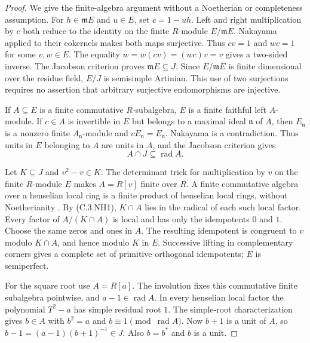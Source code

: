 \begin{proof}
We give the finite-algebra argument without a
Noetherian or completeness assumption.
For $h\in\mathfrak mE$ and $u\in E$, set
$c=1-uh$.  Left and right multiplication by
$c$ both reduce to the identity on the finite
$R$-module $E/\mathfrak mE$.
Nakayama applied to their cokernels makes
both maps surjective.  Thus $cv=1$ and
$wc=1$ for some $v,w\in E$.
The equality $w=w(cv)=(wc)v=v$ gives a
two-sided inverse.  The Jacobson criterion
proves $\mathfrak mE\subseteq J$.
Since $E/\mathfrak mE$ is finite dimensional
over the residue field, $E/J$ is semisimple
Artinian.  This use of two surjections
requires no assertion that arbitrary
surjective endomorphisms are injective.

If $A\subseteq E$ is a finite commutative
$R$-subalgebra, $E$ is a finite faithful
left $A$-module.  If $c\in A$ is invertible
in $E$ but belongs to a maximal ideal
$\mathfrak n$ of $A$, then
$E_{\mathfrak n}$ is a nonzero finite
$A_{\mathfrak n}$-module and
$cE_{\mathfrak n}=E_{\mathfrak n}$.
Nakayama is a contradiction.  Thus units
in $E$ belonging to $A$ are units in $A$,
and the Jacobson criterion gives
\[
                 A\cap J\subseteq\operatorname{rad}A.     \tag{C.3.NH1}
\]

Let $K\subseteq J$ and $v^2-v\in K$.
The determinant trick for multiplication
by $v$ on the finite $R$-module $E$
makes $A=R[v]$ finite over $R$.
A finite commutative algebra over a
henselian local ring is a finite product
of henselian local rings, without
Noetherianity
\cite[Lemma 10.153.4(1), Tag 04GH]
 {C-StacksCoherentHenselizations}.
By (C.3.NH1), $K\cap A$ lies in
the radical of each such local factor.
Every factor of $A/(K\cap A)$ is
local and has only the idempotents
$0$ and $1$.  Choose the same zeros
and ones in $A$.  The resulting
idempotent is congruent to $v$
modulo $K\cap A$, and hence modulo
$K$ in $E$.
Successive lifting in complementary
corners gives a complete set of
primitive orthogonal idempotents;
$E$ is semiperfect.

For the square root use $A=R[a]$.
The involution fixes this commutative
finite subalgebra pointwise, and
$a-1\in\operatorname{rad}A$.
In every henselian local factor
the polynomial $T^2-a$ has simple
residual root $1$.
The simple-root characterization
\cite[Lemma 10.153.3(2), Tag 04GG]
 {C-StacksCoherentHenselizations}
gives $b\in A$ with $b^2=a$
and $b\equiv1\pmod{\operatorname{rad}A}$.
Now $b+1$ is a unit of $A$, so
$b-1=(a-1)(b+1)^{-1}\in J$.
Also $b=b^*$ and $b$ is a unit.


\end{proof}
